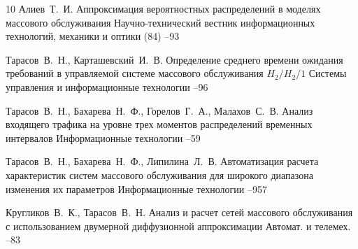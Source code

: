 \begin{thebibliography}{10}
\by Алиев~Т.~И.
\paper Аппроксимация вероятностных распределений в моделях массового обслуживания
\jour Научно-технический вестник информационных технологий, механики и оптики
(84)
--93

\by Тарасов~В.~Н., Карташевский~И.~В.
\paper Определение среднего времени ожидания требований в управляемой системе массового обслуживания $H_2/H_2/1$ 
\jour Системы управления и информационные технологии
--96



\by Тарасов~В.~Н., Бахарева~Н.~Ф., Горелов~Г.~А., Малахов~С.~В.
\paper Анализ входящего трафика на уровне трех моментов распределений временных интервалов
\jour Информационные технологии
--59


\by Тарасов~В.~Н., Бахарева~Н.~Ф., Липилина~Л.~В.
\paper Автоматизация расчета характеристик систем массового обслуживания для широкого диапазона изменения их параметров
\jour Информационные технологии
--957




\by Кругликов~В.~К., Тарасов~В.~Н.
\paper Анализ и расчет сетей массового обслуживания с использованием двумерной диффузионной аппроксимации
\jour Автомат. и телемех.
--83


\end{thebibliography}


\newpage

\makeentitle


